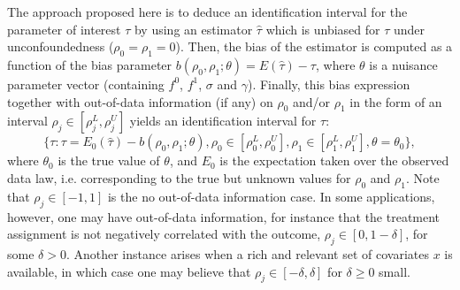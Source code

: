 \documentclass[11pt]{article}
\begin{document}
The approach proposed here is to deduce an identification interval for the parameter of interest $\tau$ by using an estimator $\hat\tau$ which is unbiased for $\tau$ under unconfoundedness ($\rho_0=\rho_1=0$). Then, the bias of the estimator is computed as a function of the bias parameter $b(\rho_0,\rho_1;\theta)=E(\hat\tau)-\tau$, where $\theta$ is a nuisance parameter vector (containing $f^0$, $f^1$, $\sigma$ and $\gamma$). Finally, this bias expression together with
out-of-data information (if any) on $\rho_0$ and/or $\rho_1$ in the form of an interval $\rho_j \in [\rho_j^L ,\rho_j^U]$ yields an identification interval for $\tau$: 
\begin{equation}\label{ident.set}
	\{\tau: \tau=E_0(\hat\tau)-b(\rho_0,\rho_1;\theta), \rho_0\in [\rho_0^L,\rho_0^U], \rho_1\in [\rho_1^L,\rho_1^U], \theta = \theta_0 \},
\end{equation}
where $\theta_0$ is the true value of $\theta$, and $E_0$ is the expectation taken over the observed data law, i.e. corresponding to the true but unknown values for $\rho_0$ and $\rho_1$. Note that $\rho_j \in [-1, 1]$ is the no out-of-data information case. In some applications, however, one may have out-of-data information, for instance that the treatment assignment is not negatively correlated with the outcome, $\rho_j \in [0,1 -\delta]$, for some $\delta>0$. Another instance arises when a rich and relevant set of covariates $x$ is available, in which case one may believe that $\rho_j \in [-\delta,\delta]$ for $\delta\geq 0$ small.

%
\end{document}
